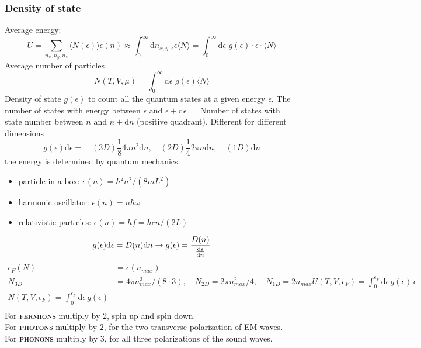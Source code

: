 \documentclass[a4paper, norsk, 8pt]{article}
\begin{document}
\begin{multicols*}{3}
\subsubsection*{\scriptsize  Density of state}
Average energy:
\begin{equation*}
  U = \sum_{n_x,n_y,n_z} \langle N(\epsilon) \rangle \epsilon(n) \approx \int_0^{\infty}\mbox{d}n_{x,y,z}\epsilon \langle N \rangle = \int_{0}^{\infty}\mbox{d}\epsilon\,\, g(\epsilon)\cdot \epsilon \cdot \langle N \rangle
\end{equation*}
Average number of particles
\begin{equation*}
  N(T,V,\mu) = \int_0^{\infty} \mbox{d}\epsilon\,\, g(\epsilon) \langle N \rangle
\end{equation*}
Density of state $g(\epsilon)$ to count all the quantum states at a given energy $\epsilon$. The number of states with energy between $\epsilon$ and $\epsilon + \mbox{d}\epsilon = $ Number of states with state number between $n$ and $n+\mbox{d}n$ (positive quadrant). Different for different dimensions
\begin{equation}
  \boxed{g(\epsilon) \mbox{d}\epsilon=} \quad(3D) \frac{1}{8}4\pi n^2 \mbox{d}n, \quad(2D) \frac{1}{4}2\pi n \mbox{d}n, \quad(1D)\mbox{d}n
\end{equation}
the energy is determined by quantum mechanics
\begin{itemize}
  \item particle in a box: $\epsilon(n) = h^2n^2/(8mL^2)$
  \item harmonic oscillator: $\epsilon(n) = n\hbar\omega$
  \item relativistic particles: $\epsilon(n) = hf = hcn/(2L)$
\end{itemize}
\begin{equation*}
    g(\epsilon)\mbox{d}\epsilon = D(n)\mbox{d}n \rightarrow g(\epsilon) = \frac{D(n)}{\dv{\epsilon}{n}}
\end{equation*}
\begin{align*}
  \epsilon_F(N) &= \epsilon(n_{max}) \\
  N_{3D} &= 4\pi n_{max}^3/(8\cdot 3), \quad N_{2D} = 2\pi n_{max}^2/4, \quad N_{1D} = 2n_{max}
  U(T,V,\epsilon_F) = \int_0^{\epsilon_F} \mbox{d}\epsilon \, g(\epsilon)\, \epsilon \\
  N(T,V,\epsilon_F) = \int_0^{\epsilon_F} \mbox{d}\epsilon \, g(\epsilon) \\

\end{align*}
For \textbf{\textsc{fermions}} multiply by $2$, spin up and spin down.\\ For \textbf{\textsc{photons}} multiply by $2$, for the two transverse polarization of EM waves.\\
For \textbf{\textsc{phonons}} multiply by $3$, for all three polarizations of the sound waves.


\end{multicols*}
\end{document}

